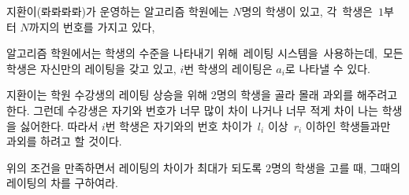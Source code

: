 지환이(롸롸롸롸)가 운영하는 알고리즘 학원에는 $N$명의 학생이 있고, 각 학생은 $1$부터 $N$까지의 번호를 가지고 있다,

알고리즘 학원에서는 학생의 수준을 나타내기 위해 레이팅 시스템을 사용하는데, 모든 학생은 자신만의 레이팅을 갖고 있고, $i$번 학생의 레이팅은 $a_i$로 나타낼 수 있다.

지환이는 학원 수강생의 레이팅 상승을 위해 $2$명의 학생을 골라 몰래 과외를 해주려고 한다. 그런데 수강생은 자기와 번호가 너무 많이 차이 나거나 너무 적게 차이 나는 학생을 싫어한다. 따라서 $i$번 학생은 자기와의 번호 차이가 $l_i$ 이상 $r_i$ 이하인 학생들과만 과외를 하려고 할 것이다.

위의 조건을 만족하면서 레이팅의 차이가 최대가 되도록 $2$명의 학생을 고를 때, 그때의 레이팅의 차를 구하여라.
